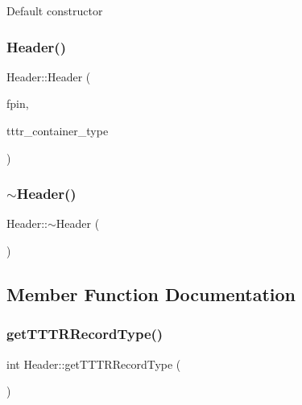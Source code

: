Default constructor \mbox{\label{class_header_aaf076044ca6c1f5b22777b5d390001e5}} 
\subsubsection{\texorpdfstring{Header()}{Header()}\hspace{0.1cm}{\footnotesize\ttfamily [2/2]}}
{\footnotesize\ttfamily Header\+::\+Header (\begin{DoxyParamCaption}\item[{std\+::\+F\+I\+LE $\ast$}]{fpin,  }\item[{int}]{tttr\+\_\+container\+\_\+type }\end{DoxyParamCaption})}

\mbox{\label{class_header_a035f03005e0534c058d61c04fa5e3c9e}} 
\subsubsection{\texorpdfstring{$\sim$\+Header()}{~Header()}}
{\footnotesize\ttfamily Header\+::$\sim$\+Header (\begin{DoxyParamCaption}{ }\end{DoxyParamCaption})}



\subsection{Member Function Documentation}
\mbox{\label{class_header_ac51d948dc51841e8b593aa80ccee8d8d}} 
\subsubsection{\texorpdfstring{get\+T\+T\+T\+R\+Record\+Type()}{getTTTRRecordType()}}
{\footnotesize\ttfamily int Header\+::get\+T\+T\+T\+R\+Record\+Type (\begin{DoxyParamCaption}{ }\end{DoxyParamCaption})}

